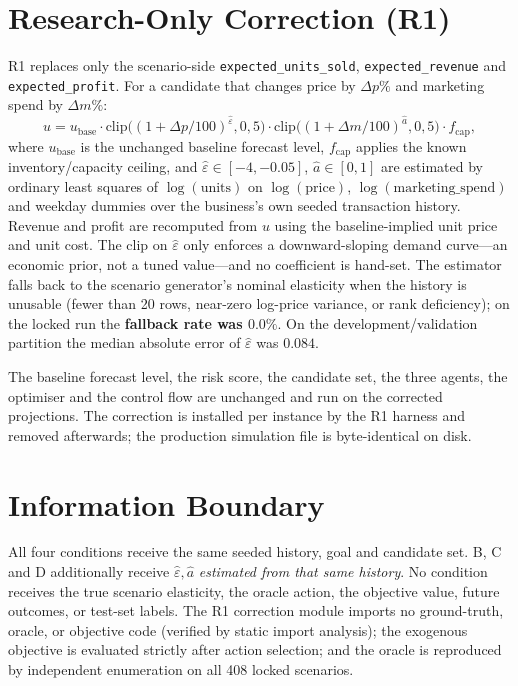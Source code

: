 \documentclass[conference]{IEEEtran}
\newcommand{\code}[1]{\texttt{#1}}
\begin{document}
\section{Research-Only Correction (R1)}\label{sec:correction}
R1 replaces only the scenario-side \code{expected\_units\_sold},
\code{expected\_revenue} and \code{expected\_profit}. For a candidate that
changes price by $\Delta p\%$ and marketing spend by $\Delta m\%$:
\begin{equation}
u = u_{\mathrm{base}}\cdot
\mathrm{clip}\!\big((1+\Delta p/100)^{\hat\varepsilon},0,5\big)\cdot
\mathrm{clip}\!\big((1+\Delta m/100)^{\hat a},0,5\big)\cdot f_{\mathrm{cap}},
\end{equation}
where $u_{\mathrm{base}}$ is the unchanged baseline forecast level,
$f_{\mathrm{cap}}$ applies the known inventory/capacity ceiling, and
$\hat\varepsilon\in[-4,-0.05]$, $\hat a\in[0,1]$ are estimated by ordinary least
squares of $\log(\text{units})$ on $\log(\text{price})$,
$\log(\text{marketing\_spend})$ and weekday dummies over the business's own
seeded transaction history. Revenue and profit are recomputed from $u$ using the
baseline-implied unit price and unit cost. The clip on $\hat\varepsilon$ only
enforces a downward-sloping demand curve---an economic prior, not a tuned
value---and no coefficient is hand-set. The estimator falls back to the scenario
generator's nominal elasticity when the history is unusable (fewer than 20 rows,
near-zero log-price variance, or rank deficiency); on the locked run the
\textbf{fallback rate was $0.0\%$}. On the development/validation partition the
median absolute error of $\hat\varepsilon$ was $0.084$.

The baseline forecast level, the risk score, the candidate set, the three
agents, the optimiser and the control flow are unchanged and run on the
corrected projections. The correction is installed per instance by the R1
harness and removed afterwards; the production simulation file is byte-identical
on disk.

\section{Information Boundary}\label{sec:info}
All four conditions receive the same seeded history, goal and candidate set.
B, C and D additionally receive $\hat\varepsilon,\hat a$ \emph{estimated from
that same history}. No condition receives the true scenario elasticity, the
oracle action, the objective value, future outcomes, or test-set labels. The R1
correction module imports no ground-truth, oracle, or objective code (verified by
static import analysis); the exogenous objective is evaluated strictly after
action selection; and the oracle is reproduced by independent enumeration on all
408 locked scenarios.
\end{document}
